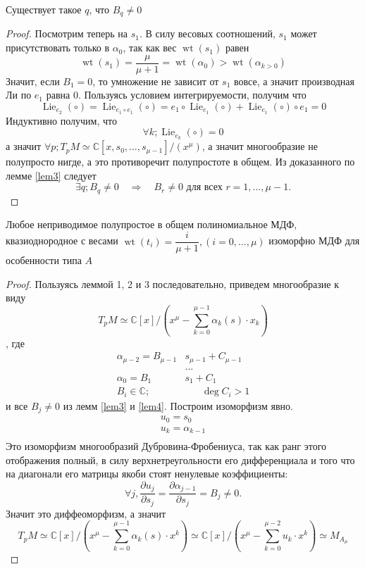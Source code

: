 \begin{lem} \label{lem4}
	Существует такое \(q\), что \(B_q \neq 0\)
\end{lem}
\begin{proof}
	Посмотрим теперь на \(s_1\). В силу весовых соотношений, \(s_1\) может присутствовать только в \(\alpha_0\), так как вес \(\operatorname{wt}(s_1)\) равен 
	\[\operatorname{wt}(s_{1}) = \dfrac{\mu}{\mu + 1} = \operatorname{wt}(\alpha_{0}) > \operatorname{wt}(\alpha_{k>0})\]
	Значит, если \(B_1=0\), то умножение не зависит от \(s_1\) вовсе, а значит производная Ли по \(e_1\) равна 0. Пользуясь условием интегрируемости, получим что 
	\[\operatorname{Lie}_{e_2}(\circ) = \operatorname{Lie}_{e_1\circ e_1}(\circ) = e_1 \circ \operatorname{Lie}_{e_1}(\circ) + \operatorname{Lie}_{e_1}(\circ) \circ e_1 = 0\]
	Индуктивно получим, что \[\forall k; \operatorname{Lie}_{e_k}(\circ) = 0\]
	а значит \(\forall p; T_pM \simeq \mathbb{C}\left[x, s_0, \dots, s_{\mu - 1}\right]/ (x^\mu)\), а значит многообразие не полупросто нигде, а это противоречит полупростоте в общем.
	Из доказанного по лемме \ref{lem3} следует 
	\[
	\exists q; B_q\neq 0
	\quad\Longrightarrow\quad
	B_r\neq 0
	\text{ для всех }r=1,\ldots,\mu-1.
	\]
\end{proof}
\begin{theorem}
	Любое неприводимое полупростое в общем полиномиальное МДФ, квазиоднородное с весами  \(\operatorname{wt}(t_i) = \dfrac{i}{\mu+1}, (i = 0, . . . , \mu)\) изоморфно МДФ для особенности типа \(A\)
\end{theorem}
\begin{proof}
	Пользуясь леммой 1, 2 и 3 последовательно, приведем многообразие к виду 
	\[
	T_pM \simeq \mathbb{C}[x]/\left(x^{\mu} - \sum_{k = 0}^{\mu - 1}\alpha_k (s)\cdot x_k\right)
	\]
	, где 
	\begin{align*}
		\alpha_{\mu - 2} = B_{\mu - 1}&s_{\mu - 1} + C_{\mu -1}\\
		&\dots\\
		\alpha_{0} = B_{1}&s_{1} + C_{1}\\
		B_i \in \mathbb{C};\hspace{20pt}& \hspace{20pt}\operatorname{deg}C_i > 1
	\end{align*} и все \(B_j \neq 0\) из лемм \ref{lem3} и \ref{lem4}.
	Построим изоморфизм явно.
	\[\begin{gathered}
		u_0 = s_0\\
		u_k = \alpha_{k-1}\\
	\end{gathered}
	\]
	Это изоморфизм многообразий Дубровина-Фробениуса, так как ранг этого отображения полный, в силу верхнетреугольности его дифференциала и того что на диагонали его матрицы якоби стоят ненулевые коэффициенты: \[\forall j, \dfrac{\partial u_j}{\partial s_j} = \dfrac{\partial \alpha_{j-1}}{\partial s_j} = B_j \neq 0.\] Значит это диффеоморфизм, а значит 
	\[T_pM \simeq \mathbb{C}\left[x\right]/\left(x^{\mu} - \sum_{k = 0}^{\mu - 1}\alpha_k (s)\cdot x^k\right) \simeq \mathbb{C}\left[x\right]/\left(x^{\mu} - \sum_{k = 0}^{\mu - 2} u_k\cdot x^k\right) \simeq M_{A_\mu}\]
\end{proof}
